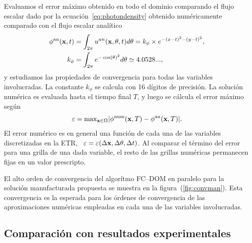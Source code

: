 Evaluamos el error máximo obtenido en todo el dominio 
comparando el flujo escalar dado por la ecuación~\eqref{eq:photondensity} 
obtenido numéricamente comparado con el flujo escalar analítico
\begin{equation*}
\begin{split}
\begin{aligned}
\phi^{\text{an}}(\mathbf{x},t)&=\int_{2\pi} u^{an}(\mathbf{x},\theta,t) d\theta=
k_{\phi}\times e^{-(x-t)^2-(y-t)^2},\\
k_{\phi}&=\int_{2\pi}e^{-\cos(\theta)^2}d\theta\simeq 4.0528...,
\end{aligned}
\end{split}
\label{eq:photondensityan}
\end{equation*}
y estudiamos las propiedades de convergencia 
para todas las variables involucradas. La constante 
$k_{\phi}$ se calcula con 16 dígitos de precisión. 
La solución numérica es evaluada hasta el tiempo final $T$, 
y luego se cálcula el error máximo según
\begin{equation*}
\varepsilon=\text{max}_{\mathbf{x} \in \Omega} |\phi^{\text{num}}(\mathbf{x},T) -\phi^{\text{an}}(\mathbf{x},T)|.
\label{eq:maximumerror}
\end{equation*}
El error numérico es en general una función 
de cada una de las variables discretizadas en la ETR, 
\ie~$\varepsilon=\varepsilon(\Delta \mathbf{x}, \Delta \theta, \Delta t)$. 
Al comparar el término del error para una grilla de una dada variable, 
el resto de las grillas numéricas permanecen fijas en un valor prescripto.

El alto orden de convergencia del algorítmo FC--DOM en paralelo 
para la solución manufacturada propuesta se muestra en la figura~(\ref{fig:convman}). 
Esta convergencia es la esperada para 
los órdenes de convergencia de las aproximaciones 
numéricas empleadas 
en cada una de las variables involucradas. 
\pagebreak
\clearpage
\subsection{Comparación con resultados experimentales}
\label{sec:resexp}

